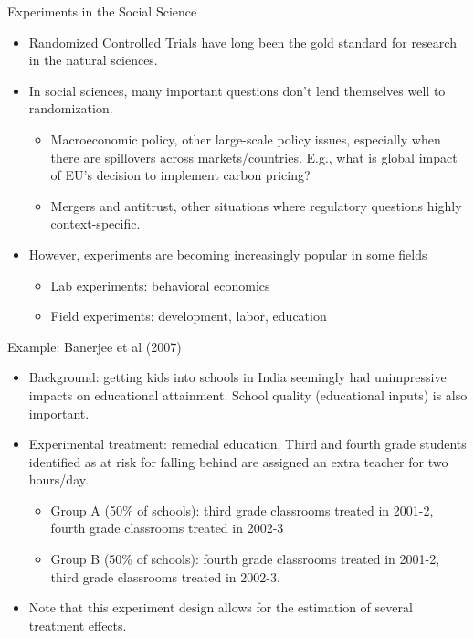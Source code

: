 \documentclass[aspectratio=169,11pt]{beamer}
\begin{document}
\begin{frame}{Experiments in the Social Science}
\begin{itemize}
  \item Randomized Controlled Trials have long been the gold standard for research
  in the natural sciences.

  \smallskip
  \item In social sciences, many important questions don't lend themselves well
  to randomization.
  \begin{itemize}
    \item Macroeconomic policy, other large-scale policy issues, especially
    when there are spillovers across markets/countries. E.g., what is global
    impact of EU's decision to implement carbon pricing?
    \item Mergers and antitrust, other situations where regulatory questions highly
     context-specific.
  \end{itemize}

  \smallskip
  \item However, experiments are becoming increasingly popular in some fields
  \begin{itemize}
    \item Lab experiments: behavioral economics
    \item Field experiments: development, labor, education
  \end{itemize}

\end{itemize}
\end{frame}



\begin{frame}{Example: Banerjee et al (2007)}
\begin{itemize}
  \item Background: getting kids into schools in India seemingly had
  unimpressive impacts on educational attainment. School quality
  (educational inputs) is also important.

  \smallskip
  \item Experimental treatment: remedial education. Third and fourth
  grade students identified as at risk for falling behind are assigned
  an extra teacher for two hours/day.
  \begin{itemize}
    \item Group A (50\% of schools): third grade classrooms treated
    in 2001-2, fourth grade classrooms treated in 2002-3
    \item Group B (50\% of schools): fourth grade classrooms
    treated in 2001-2, third grade classrooms treated in 2002-3.

\end{itemize}
  \item Note that this experiment design allows for the estimation of several
  treatment effects. 

\end{itemize}
\end{frame}
\end{document}
